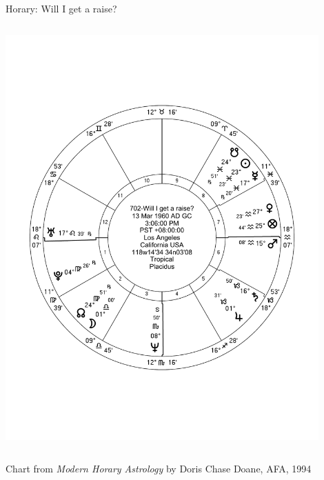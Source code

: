 \begin{frame}[t]{Horary: Will I get a raise?}
\begin{columns}[T, onlytextwidth]
\vspace{-20px}
\begin{center}
{\includegraphics[width=0.9\textwidth]{charts/Doane-702}} \\
\scriptsize
\end{center}
\end{columns}
\scriptsize
Chart from \textsl{Modern Horary Astrology} by Doris Chase Doane, AFA, 1994
\end{frame}